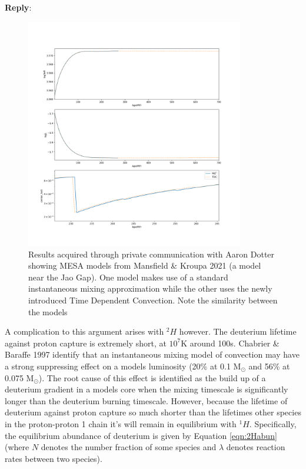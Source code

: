 \documentclass[11pt]{article}
\newenvironment{reply}
   {\medskip \noindent \begin{sf}\textbf{Reply}:\  }
   {\medskip \end{sf}}
\begin{document}
\begin{reply}
\begin{figure}
		\includegraphics[width=0.85\textwidth]{./Figure_4_zoom.png}
		\caption{Results acquired through private communication with Aaron Dotter showing
		MESA models from Mansfield \& Kroupa 2021 (a model near the Jao Gap). One
		model makes use of a standard instantaneous mixing approximation while the other
		uses the newly introduced Time Dependent Convection. Note the similarity between the
		models}
		\label{fig:MESA2}
	\end{figure}

	A complication to this argument arises with $^{2}H$ however. The deuterium
	lifetime against proton capture is extremely short, at $10^{7}$K around
	100s. Chabrier \& Baraffe 1997 identify that an instantaneous mixing model
	of convection may have a strong suppressing effect on a models luminosity
	(20\%  at 0.1 M$_{\odot}$ and 56\% at 0.075 M$_{\odot}$). The root cause of
	this effect is identified as the build up of a deuterium gradient in a
	models core when the mixing timescale is significantly longer than the
	deuterium burning timescale. However, because the lifetime of deuterium
	against proton capture so much shorter than the lifetimes other species in
	the proton-proton 1 chain it's will remain in equilibrium with $^{1}H$. Specifically, the
	equilibrium abundance of deuterium is given by Equation \ref{eqn:2Habun}
	(where $N$ denotes the number fraction of some species and $\lambda$
	denotes reaction rates between two species).


\end{reply}
\end{document}
